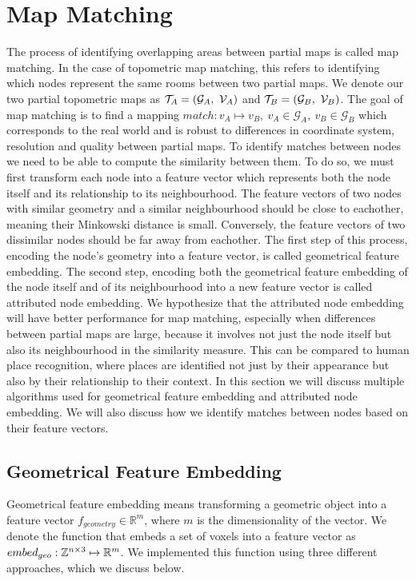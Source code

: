 \section{Map Matching}
The process of identifying overlapping areas between partial maps is called map matching. In the case of topometric map matching, this refers to identifying which nodes represent the same rooms between two partial maps. We denote our two partial topometric maps as \(\topometricmap_A = (\mathcal{G}_A,\ \voxelgrid_A)\) and \(\mathcal{T}_B = (\mathcal{G}_B,\ \mathcal{V}_B)\). The goal of map matching is to find a mapping \(match: v_A \mapsto v_B,\ v_A \in \mathcal{G}_A,\ v_B \in \mathcal{G}_B\) which corresponds to the real world and is robust to differences in coordinate system, resolution and quality between partial maps. To identify matches between nodes we need to be able to compute the similarity between them. To do so, we must first transform each node into a feature vector which represents both the node itself and its relationship to its neighbourhood. The feature vectors of two nodes with similar geometry and a similar neighbourhood should be close to eachother, meaning their Minkowski distance is small. Conversely, the feature vectors of two dissimilar nodes should be far away from eachother. The first step of this process, encoding the node's geometry into a feature vector, is called geometrical feature embedding. The second step, encoding both the geometrical feature embedding of the node itself and of its neighbourhood into a new feature vector is called attributed node embedding. We hypothesize that the attributed node embedding will have better performance for map matching, especially when differences between partial maps are large, because it involves not just the node itself but also its neighbourhood in the similarity measure. This can be compared to human place recognition, where places are identified not just by their appearance but also by their relationship to their context. In this section we will discuss multiple algorithms used for geometrical feature embedding and attributed node embedding. We will also discuss how we identify matches between nodes based on their feature vectors.

\subsection{Geometrical Feature Embedding}
Geometrical feature embedding means transforming a geometric object into a feature vector \(f_{geometry} \in \mathbb{R}^m\), where \(m\) is the dimensionality of the vector. We denote the function that embeds a set of voxels into a feature vector as \(embed_{geo}: \mathbb{Z}^{n \times 3} \mapsto \mathbb{R}^m\). We implemented this function using three different approaches, which we discuss below.

